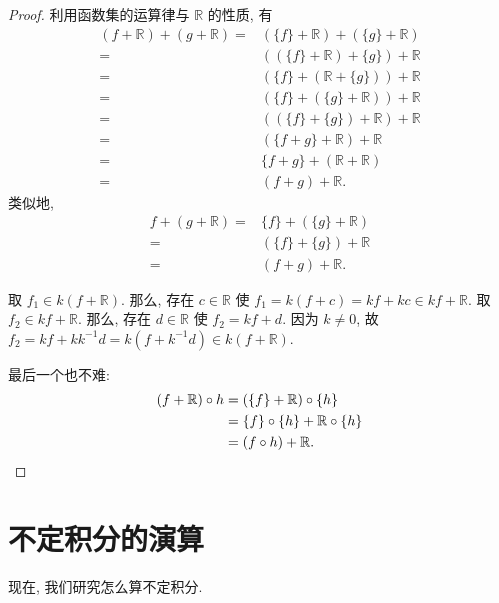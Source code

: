 \begin{proof}
    利用函数集的运算律与 $\mathbb{R}$ 的性质, 有
    \begin{align*}
        (f + \mathbb{R}) + (g + \mathbb{R})
        = {} & (\{ f \} + \mathbb{R}) + (\{ g \} + \mathbb{R}) \\
        = {} & ((\{ f \} + \mathbb{R}) + \{ g \}) + \mathbb{R} \\
        = {} & (\{ f \} + (\mathbb{R} + \{ g \})) + \mathbb{R} \\
        = {} & (\{ f \} + (\{ g \} + \mathbb{R})) + \mathbb{R} \\
        = {} & ((\{ f \} + \{ g \}) + \mathbb{R}) + \mathbb{R} \\
        = {} & (\{ f + g \} + \mathbb{R}) + \mathbb{R}         \\
        = {} & \{ f + g \} + (\mathbb{R} + \mathbb{R})         \\
        = {} & (f + g) + \mathbb{R}.
    \end{align*}
    类似地,
    \begin{align*}
        f + (g + \mathbb{R})
        = {} & \{ f \} + (\{ g \} + \mathbb{R}) \\
        = {} & (\{ f \} + \{ g \}) + \mathbb{R} \\
        = {} & (f + g) + \mathbb{R}.
    \end{align*}

    取 $f_1 \in k(f + \mathbb{R})$. 那么, 存在 $c \in \mathbb{R}$ 使 $f_1 = k(f + c) = kf + kc \in kf + \mathbb{R}$. 取 $f_2 \in kf + \mathbb{R}$. 那么, 存在 $d \in \mathbb{R}$ 使 $f_2 = kf + d$. 因为 $k \neq 0$, 故 $f_2 = kf + kk^{-1}d = k(f + k^{-1}d) \in k(f + \mathbb{R})$.

    最后一个也不难:
    \begin{align*}
        (f + \mathbb{R}) \circ h
        = {} & (\{ f \} + \mathbb{R}) \circ \{ h \}             \\
        = {} & \{ f \} \circ \{ h \} + \mathbb{R} \circ \{ h \} \\
        = {} & ( f \circ h ) + \mathbb{R}. \qedhere
    \end{align*}
\end{proof}

\section{不定积分的演算}

现在, 我们研究怎么算不定积分.

